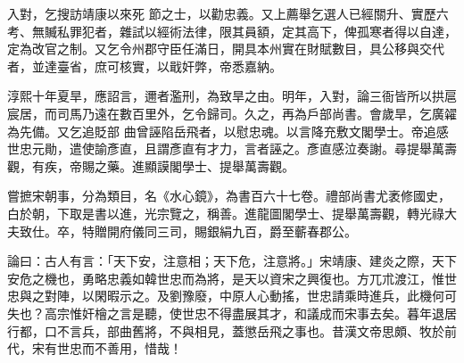 \begin{pinyinscope}
 入對，乞搜訪靖康以來死
 節之士，以勸忠義。又上薦舉乞選人已經關升、實歷六考、無贓私罪犯者，雜試以經術法律，限其員額，定其高下，俾孤寒者得以自達，定為改官之制。又乞令州郡守臣任滿日，開具本州實在財賦數目，具公移與交代者，並達臺省，庶可核實，以戢奸弊，帝悉嘉納。



 淳熙十年夏旱，應詔言，邇者濫刑，為致旱之由。明年，入對，論三衙皆所以拱扈宸居，而司馬乃遠在數百里外，乞令歸司。久之，再為戶部尚書。會歲旱，乞廣糴為先備。又乞追貶部
 曲曾誣陷岳飛者，以慰忠魂。以言降充敷文閣學士。帝追感世忠元勛，遣使諭彥直，且謂彥直有才力，言者誣之。彥直感泣奏謝。尋提舉萬壽觀，有疾，帝賜之藥。進顯謨閣學士、提舉萬壽觀。



 嘗摭宋朝事，分為類目，名《水心鏡》，為書百六十七卷。禮部尚書尤袤修國史，白於朝，下取是書以進，光宗覽之，稱善。進龍圖閣學士、提舉萬壽觀，轉光祿大夫致仕。卒，特贈開府儀同三司，賜銀絹九百，爵至蘄春郡公。



 論曰：古人有言：「天下安，注意相；天下危，注意將。」宋靖康、建炎之際，天下安危之機也，勇略忠義如韓世忠而為將，是天以資宋之興復也。方兀朮渡江，惟世忠與之對陣，以閑暇示之。及劉豫廢，中原人心動搖，世忠請乘時進兵，此機何可失也？高宗惟奸檜之言是聽，使世忠不得盡展其才，和議成而宋事去矣。暮年退居行都，口不言兵，部曲舊將，不與相見，蓋懲岳飛之事也。昔漢文帝思頗、牧於前代，宋有世忠而不善用，惜哉！



\end{pinyinscope}